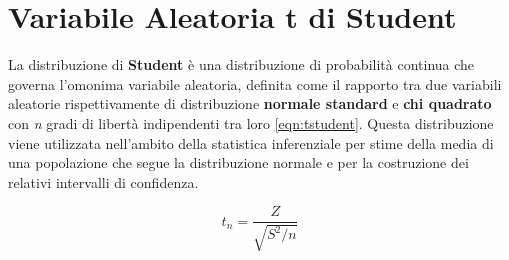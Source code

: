 \chapter[Variabile Aleatoria t di Student]{Variabile Aleatoria t di Student}

La distribuzione di \textbf{Student} è una distribuzione di probabilità continua che governa l'omonima variabile aleatoria, definita come il rapporto tra due variabili aleatorie rispettivamente di distribuzione \textbf{normale standard} e \textbf{chi quadrato} con \textit{n} gradi di libertà indipendenti tra loro \eqref{eqn:tstudent}. Questa distribuzione viene utilizzata nell'ambito della statistica inferenziale per stime della media di una popolazione che segue la distribuzione normale e per la costruzione dei relativi intervalli di confidenza.

\begin{equation}
\label{eqn:tstudent}
t_{n} = \frac{Z}{\sqrt{{S^2}\slash{n}}}
\end{equation}